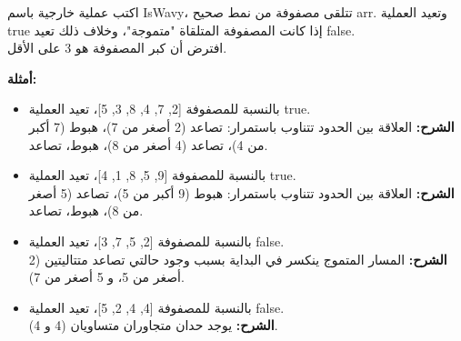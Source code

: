 \documentclass[14pt]{extarticle}
\begin{document}
اكتب عملية خارجية باسم \textenglish{IsWavy}، تتلقى مصفوفة من نمط صحيح \textenglish{arr}.
وتعيد العملية \textenglish{true} إذا كانت المصفوفة المتلقاة "متموجة"، وخلاف ذلك تعيد \textenglish{false}. \\
افترض أن كبر المصفوفة هو 3 على الأقل.

\textbf{أمثلة:}
\begin{itemize}
  \item بالنسبة للمصفوفة \textenglish{[2, 7, 4, 8, 3, 5]}، تعيد العملية \textenglish{true}.\\
  \textbf{الشرح:} العلاقة بين الحدود تتناوب باستمرار: تصاعد (2 أصغر من 7)، هبوط (7 أكبر من 4)، تصاعد (4 أصغر من 8)، هبوط، تصاعد.

  \item بالنسبة للمصفوفة \textenglish{[9, 5, 8, 1, 4]}، تعيد العملية \textenglish{true}.\\
  \textbf{الشرح:} العلاقة بين الحدود تتناوب باستمرار: هبوط (9 أكبر من 5)، تصاعد (5 أصغر من 8)، هبوط، تصاعد.

  \item بالنسبة للمصفوفة \textenglish{[2, 5, 7, 3]}، تعيد العملية \textenglish{false}.\\
  \textbf{الشرح:} المسار المتموج ينكسر في البداية بسبب وجود حالتي تصاعد متتاليتين (2 أصغر من 5، و 5 أصغر من 7).

  \item بالنسبة للمصفوفة \textenglish{[4, 4, 2, 5]}، تعيد العملية \textenglish{false}.\\
  \textbf{الشرح:} يوجد حدان متجاوران متساويان (4 و 4).
\end{itemize}
\end{document}
